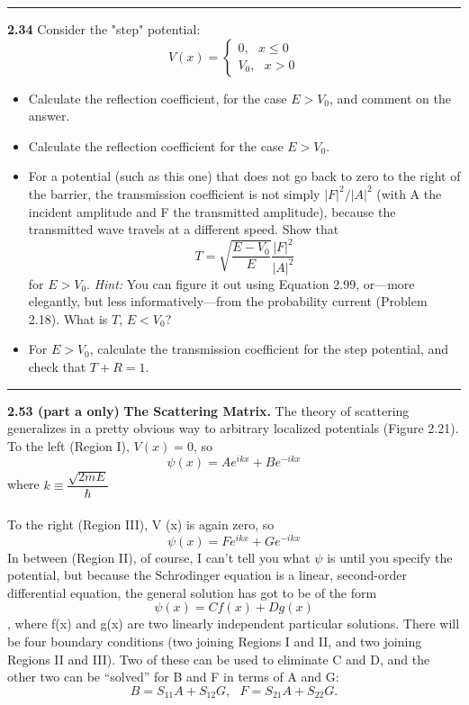 \documentclass[fleqn]{article}
\begin{document}
  \rule{15cm}{1pt}

  \textbf{2.34}
  Consider the "step" potential: 
  $$V(x)=\begin{cases}
    0, ~~~ x\leqslant 0 \\
    V_0, ~~~ x > 0
  \end{cases}$$
\begin{itemize}
  \item Calculate the reflection coefficient, for the case $E>V_0$, and comment on the answer.

  \item Calculate the reflection coefficient for the case $E>V_0$.

  \item For a potential (such as this one) that does not go back to zero to the right of the barrier,
  the transmission coefficient is not simply $|F|^2/|A|^2$ (with A the incident amplitude and F
  the transmitted amplitude), because the transmitted wave travels at a different speed. Show
  that
  $$T=\sqrt{\dfrac{E-V_0}{E}}\dfrac{|F|^2}{|A|^2}$$
  for $E>V_0$. \emph{Hint:} You can figure it out using Equation 2.99, or—more elegantly, but less
  informatively—from the probability current (Problem 2.18). What is $T$, $E<V_0?$

  \item For $E>V_0$, calculate the transmission coefficient for the step potential, and check that $T+R=1$.
  
\end{itemize}

\rule{15cm}{1pt}

\textbf{2.53 (part a only)}
\textbf{The Scattering Matrix.} The theory of scattering generalizes in a pretty obvious way to
arbitrary localized potentials (Figure 2.21). To the left (Region I), $V(x)=0$, so 
$$\psi(x)=A e^{ikx}+B e^{-ikx}$$
where $k\equiv \dfrac{\sqrt{2mE}}{\hbar}$
\\
\\
To the right (Region III), V (x) is again zero, so 
$$\psi(x)=F e^{ikx}+G e^{-ikx}$$ 
In between (Region II), of course, I can’t tell you what $\psi$ is until you specify the potential, but
because the Schr$\ddot{o}$dinger equation is a linear, second-order differential equation, the general
solution has got to be of the form 
$$\psi(x)=C f(x)+D g(x)$$,
where f(x) and g(x) are two linearly independent particular solutions. There will be four
boundary conditions (two joining Regions I and II, and two joining Regions II and III). Two of
these can be used to eliminate C and D, and the other two can be “solved” for B and F in terms
of A and G:
$$B=S_{11} A+S_{12} G, ~~~ F=S_{21}A +S_{22} G.$$
\end{document}
